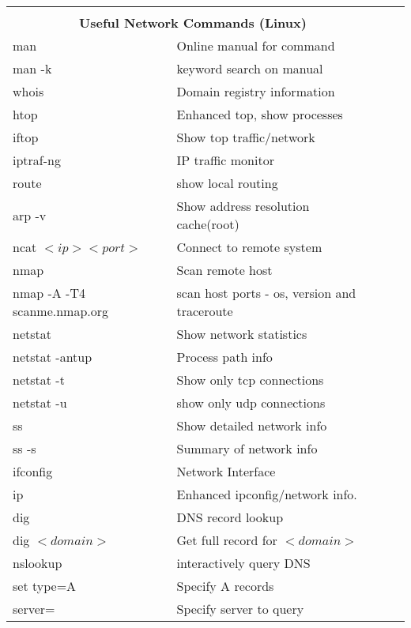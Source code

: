 \begin{table}
\begin{tabular}{|ll|ll|}
    \hline
    \multicolumn{2}{|c|}{} \\
    \multicolumn{2}{|c|}{\textbf{Useful Network Commands (Linux)}}\\[6pt]
    \hline
    man    & Online manual for command              \\
    man -k         & keyword search on manual       \\
    whois             & Domain registry information \\
    htop           & Enhanced top, show processes        \\
    iftop             & Show top traffic/network    \\
    iptraf-ng      & IP traffic monitor                  \\
    route             & show local routing          \\
    arp -v         & Show address resolution cache(root) \\
    ncat $<ip> <port>$& Connect to remote system    \\
    nmap           & Scan remote host                    \\
    nmap -A -T4  scanme.nmap.org & scan host ports - os, version and traceroute \\
    netstat           & Show network statistics     \\
    netstat -antup & Process path info                   \\
    netstat -t        & Show only tcp connections   \\
    netstat -u     & show only udp connections           \\
    ss                & Show detailed network info  \\
    ss -s          & Summary of network info             \\
    ifconfig          & Network Interface           \\
    ip             & Enhanced ipconfig/network info.     \\
    dig               & DNS record lookup           \\
    dig $<domain>$ & Get full record for $<domain>$      \\
    \hline
    nslookup          & interactively query DNS     \\
    \hspace{3em} set type=A     & Specify A records                   \\
    \hspace{3em} server=        & Specify server to query             \\
   \hline
\end{tabular}
\end{table}
